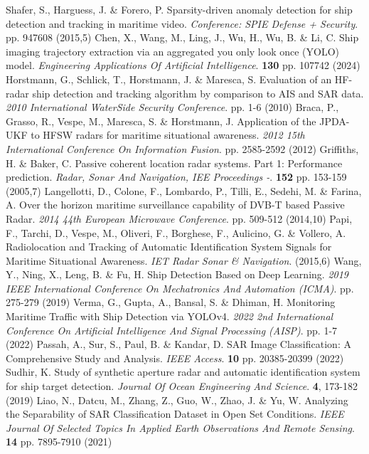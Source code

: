 Shafer, S., Harguess, J. \& Forero, P. Sparsity-driven anomaly detection for ship detection and tracking in maritime video. {\em Conference: SPIE Defense + Security}. pp. 947608 (2015,5)
Chen, X., Wang, M., Ling, J., Wu, H., Wu, B. \& Li, C. Ship imaging trajectory extraction via an aggregated you only look once (YOLO) model. {\em Engineering Applications Of Artificial Intelligence}. \textbf{130} pp. 107742 (2024)
Horstmann, G., Schlick, T., Horstmann, J. \& Maresca, S. Evaluation of an HF-radar ship detection and tracking algorithm by comparison to AIS and SAR data. {\em 2010 International WaterSide Security Conference}. pp. 1-6 (2010)
Braca, P., Grasso, R., Vespe, M., Maresca, S. \& Horstmann, J. Application of the JPDA-UKF to HFSW radars for maritime situational awareness. {\em 2012 15th International Conference On Information Fusion}. pp. 2585-2592 (2012)
Griffiths, H. \& Baker, C. Passive coherent location radar systems. Part 1: Performance prediction. {\em Radar, Sonar And Navigation, IEE Proceedings -}. \textbf{152} pp. 153-159 (2005,7)
Langellotti, D., Colone, F., Lombardo, P., Tilli, E., Sedehi, M. \& Farina, A. Over the horizon maritime surveillance capability of DVB-T based Passive Radar. {\em 2014 44th European Microwave Conference}. pp. 509-512 (2014,10)
Papi, F., Tarchi, D., Vespe, M., Oliveri, F., Borghese, F., Aulicino, G. \& Vollero, A. Radiolocation and Tracking of Automatic Identification System Signals for Maritime Situational Awareness. {\em IET Radar Sonar \& Navigation}. (2015,6)
Wang, Y., Ning, X., Leng, B. \& Fu, H. Ship Detection Based on Deep Learning. {\em 2019 IEEE International Conference On Mechatronics And Automation (ICMA)}. pp. 275-279 (2019)
Verma, G., Gupta, A., Bansal, S. \& Dhiman, H. Monitoring Maritime Traffic with Ship Detection via YOLOv4. {\em 2022 2nd International Conference On Artificial Intelligence And Signal Processing (AISP)}. pp. 1-7 (2022)
Passah, A., Sur, S., Paul, B. \& Kandar, D. SAR Image Classification: A Comprehensive Study and Analysis. {\em IEEE Access}. \textbf{10} pp. 20385-20399 (2022)
Sudhir, K. Study of synthetic aperture radar and automatic identification system for ship target detection. {\em Journal Of Ocean Engineering And Science}. \textbf{4}, 173-182 (2019)
Liao, N., Datcu, M., Zhang, Z., Guo, W., Zhao, J. \& Yu, W. Analyzing the Separability of SAR Classification Dataset in Open Set Conditions. {\em IEEE Journal Of Selected Topics In Applied Earth Observations And Remote Sensing}. \textbf{14} pp. 7895-7910 (2021)
